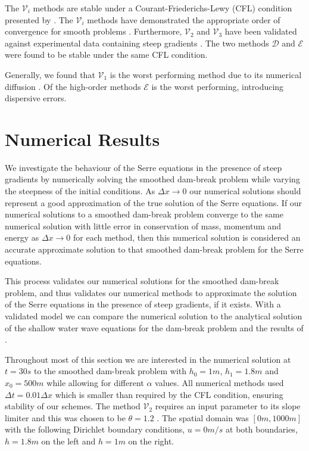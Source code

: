 \documentclass[times]{elsarticle}
\begin{document}
The $\mathcal{V}_i$ methods are stable under a Courant-Friederichs-Lewy (CFL) condition  presented by \citet{Harten-etal-1983-357}. The $\mathcal{V}_i$ methods have demonstrated the appropriate order of convergence for smooth problems \cite{Zoppou-etal-2017}. Furthermore, $\mathcal{V}_2$ and $\mathcal{V}_3$ have been validated against experimental data containing steep gradients \cite{Zoppou-etal-2017}. The two methods $\mathcal{D}$ and $\mathcal{E}$ were found to be stable under the same CFL condition.

Generally, we found that $\mathcal{V}_1$ is the worst performing method due to its numerical diffusion \cite{Zoppou-etal-2017}. Of the high-order methods $\mathcal{E}$ is the worst performing, introducing dispersive errors.

\section{Numerical Results}
\label{section:NumRes}
We investigate the behaviour of the Serre equations in the presence of steep gradients by numerically solving the smoothed dam-break problem while varying the steepness of the initial conditions. As $\Delta x \rightarrow 0$ our numerical solutions should represent a good approximation of the true solution of the Serre equations. If our numerical solutions to a smoothed dam-break problem converge to the same numerical solution with little error in conservation of mass, momentum and energy as $\Delta x \rightarrow 0$ for each method, then this numerical solution is considered an accurate approximate solution to that smoothed dam-break problem for the Serre equations.

This process validates our numerical solutions for the smoothed dam-break problem, and thus validates our numerical methods to approximate the solution of the Serre equations in the presence of steep gradients, if it exists. With a validated model we can compare the numerical solution to the analytical solution of the shallow water wave equations for the dam-break problem and the results of \citet{El-etal-2006}.

Throughout most of this section we are interested in the numerical solution at $t=30s$ to the smoothed dam-break problem with $h_0 = 1m$, $h_1 = 1.8m$ and $x_0 = 500m$ while allowing for different $\alpha$ values. All numerical methods used $\Delta t = 0.01 \Delta x$ which is smaller than required by the CFL condition, ensuring stability of our schemes. The method $\mathcal{V}_2$ requires an input parameter to its slope limiter and this was chosen to be $\theta = 1.2$ \cite{Zoppou-etal-2017}. The spatial domain was $[0m,1000m]$ with the following Dirichlet boundary conditions, $u = 0m/s$ at both boundaries, $h =1.8m$ on the left and $h =1m$ on the right.
\end{document}
